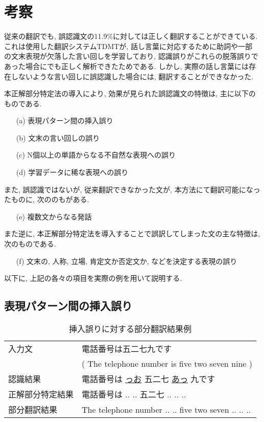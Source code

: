 \vspace{-2mm}
\section{考察}
\vspace{-2mm}

従来の翻訳でも, 誤認識文の11.9\%に対しては正しく翻訳することができている. 
これは使用した翻訳システムTDMTが, 話し言葉に対応するために助詞や一部
の文末表現が欠落した言い回しを学習しており, 認識誤りがこれらの脱落誤りであった場合にでも正しく解析できたためである. しかし, 実際の話し言葉には存在しないような言い回しに誤認識した場合には, 翻訳することができなかった. 

本正解部分特定法の導入により, 効果が見られた誤認識文の特徴は, 
主に以下のものである. 
\begin{itemize}
\item [(a)] 表現パターン間の挿入誤り
\item [(b)] 文末の言い回しの誤り
\item [(c)] N個以上の単語からなる不自然な表現への誤り
\item [(d)] 学習データに稀な表現への誤り
\end{itemize}
また, 誤認識ではないが, 従来翻訳できなかった文が, 本方法にて翻訳可能になったものに, 次ののもがある. 
\begin{itemize}
\item [(e)] 複数文からなる発話
\end{itemize}
また逆に, 本正解部分特定法を導入することで誤訳してしまった文の主な特徴は, 次のものである. 
\begin{itemize}
\item [(f)] 文末の, 人称, 立場, 肯定文か否定文か, などを決定する表現の誤り
\end{itemize}

以下に, 上記の各々の項目を実際の例を用いて説明する. 

\subsection{表現パターン間の挿入誤り}

\begin{table}
\caption{挿入誤りに対する部分翻訳結果例}
\label{tab:ex_error1}
\center
\begin{tabular}{|l|l|}
\hline
入力文 & 電話番号は五二七九です\\
          & ( The telephone number is five two seven nine )\\ \hline
認識結果  & 電話番号は \underline{っお} 五二七 \underline{あっ} 九です \\ \hline 
正解部分特定結果 & 電話番号は .. .. 五二七 .. .. ..\\ \hline
部分翻訳結果     & The telephone number .. .. five two seven .. .. .. \\ \hline 
 \end{tabular}
\end{table}

